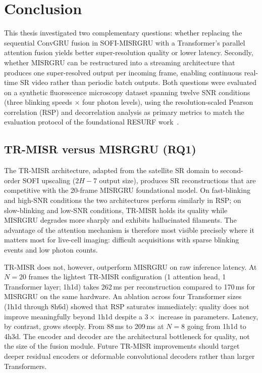 \chapter{Conclusion}
\label{chapter:conclusion}

This thesis investigated two complementary questions: whether replacing the sequential
ConvGRU fusion in SOFI-MISRGRU with a Transformer's parallel attention fusion yields
better super-resolution quality or lower latency. Secondly, whether MISRGRU can be 
restructured into a streaming architecture that produces one super-resolved output per 
incoming frame, enabling continuous real-time SR video rather than periodic batch outputs.
Both questions were evaluated on a synthetic fluorescence microscopy dataset spanning
twelve SNR conditions (three blinking speeds $\times$ four photon levels), using the
resolution-scaled Pearson correlation (RSP) and decorrelation analysis as primary metrics
to match the evaluation protocol of the foundational RESURF work~\cite{resurf2024}.

\section*{TR-MISR versus MISRGRU (RQ1)}

The TR-MISR architecture, adapted from the satellite SR domain to second-order SOFI upscaling
($2H{-}7$ output size), produces SR reconstructions that are competitive with the 20-frame
MISRGRU foundational model.
On fast-blinking and high-SNR conditions the two architectures perform similarly in RSP;
on slow-blinking and low-SNR conditions, TR-MISR holds its quality while MISRGRU degrades
more sharply and exhibits hallucinated filaments.
The advantage of the attention mechanism is therefore most visible precisely where it
matters most for live-cell imaging: difficult acquisitions with sparse blinking events and
low photon counts.

TR-MISR does not, however, outperform MISRGRU on raw inference latency.
At $N{=}20$ frames the lightest TR-MISR configuration (1 attention head, 1 Transformer
layer; 1h1d) takes 262\,ms per reconstruction compared to 170\,ms for MISRGRU on the same
hardware.
An ablation across four Transformer sizes (1h1d through 8h6d) showed that RSP saturates
immediately: quality does not improve meaningfully beyond 1h1d despite a $3\times$ increase
in parameters.
Latency, by contrast, grows steeply. From 88\,ms to 209\,ms at $N{=}8$ going from 1h1d
to 4h3d.
The encoder and decoder are the architectural bottleneck for quality, not the size 
of the fusion module.
Future TR-MISR improvements should target deeper residual encoders or deformable
convolutional decoders rather than larger Transformers.

